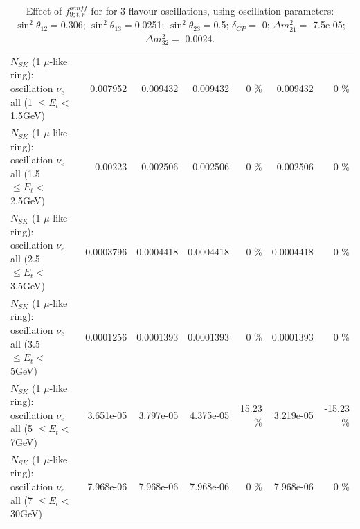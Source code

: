 \begin{table}
\begin{tabular}{| l | r | r | r  r | r  r |}
$N_{SK}$ (1 $\mu$-like ring): oscillation $\nu_{e}$ all (1 $\leq E_{t} <$ 1.5GeV) &        0.007952 &        0.009432 &        0.009432 &        0 \%  &        0.009432 &        0 \%  \\ 
$N_{SK}$ (1 $\mu$-like ring): oscillation $\nu_{e}$ all (1.5 $\leq E_{t} <$ 2.5GeV) &         0.00223 &        0.002506 &        0.002506 &        0 \%  &        0.002506 &        0 \%  \\ 
$N_{SK}$ (1 $\mu$-like ring): oscillation $\nu_{e}$ all (2.5 $\leq E_{t} <$ 3.5GeV) &       0.0003796 &       0.0004418 &       0.0004418 &        0 \%  &       0.0004418 &        0 \%  \\ 
$N_{SK}$ (1 $\mu$-like ring): oscillation $\nu_{e}$ all (3.5 $\leq E_{t} <$ 5GeV) &       0.0001256 &       0.0001393 &       0.0001393 &        0 \%  &       0.0001393 &        0 \%  \\ 
 $N_{SK}$ (1 $\mu$-like ring): oscillation $\nu_{e}$ all (5 $\leq E_{t} <$ 7GeV) &       3.651e-05 &       3.797e-05 &       4.375e-05 &    15.23 \%  &       3.219e-05 &   -15.23 \%  \\ 
$N_{SK}$ (1 $\mu$-like ring): oscillation $\nu_{e}$ all (7 $\leq E_{t} <$ 30GeV) &       7.968e-06 &       7.968e-06 &       7.968e-06 &        0 \%  &       7.968e-06 &        0 \%  \\ 
\hline
\hline
\end{tabular}
\caption{ Effect of $f_{9; t, r}^{banff}$ for for 3 flavour oscillations, using oscillation parameters:  $\sin^2\theta_{12} = $0.306; $\sin^2\theta_{13} = $0.0251; $\sin^2\theta_{23} = $0.5; $\delta_{CP} = $        0; $\Delta m^2_{21} = $    7.5e-05; $\Delta m^2_{32} = $    0.0024. }
\label{tab:num_banff_09_1RmuT_3f_osc_t13:0.0251}
\end{table}
\clearpage
